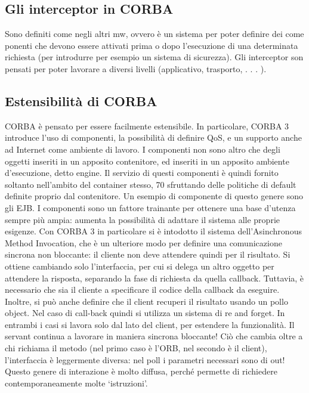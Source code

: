 \subsection{Gli interceptor in CORBA}
Sono definiti come negli altri mw, ovvero è un sistema per poter definire dei come
ponenti che devono essere attivati prima o dopo l'esecuzione di una determinata
richiesta (per introdurre per esempio un sistema di sicurezza). Gli interceptor
son pensati per poter lavorare a diversi livelli (applicativo, trasporto, . . . ).
\subsection{Estensibilità di CORBA}
CORBA è pensato per essere facilmente estensibile. In particolare, CORBA
3 introduce l'uso di componenti, la possibilità di definire QoS, e un supporto
anche ad Internet come ambiente di lavoro.
I componenti non sono altro che degli oggetti inseriti in un apposito contenitore, ed inseriti in un apposito ambiente
d'esecuzione, detto engine. Il servizio
di questi componenti è quindi fornito soltanto nell'ambito del container stesso,
70
sfruttando delle politiche di default definite proprio dal contenitore. Un esempio
di componente di questo genere sono gli EJB.
I componenti sono un fattore trainante per ottenere una base d'utenza sempre più ampia: aumenta la possibilità di
adattare il sistema alle proprie esigenze.
Con CORBA 3 in particolare si è intodotto il sistema dell'Asinchronous
Method Invocation, che è un ulteriore modo per definire una comunicazione
sincrona non bloccante: il cliente non deve attendere quindi per il risultato.
Si ottiene cambiando solo l'interfaccia, per cui si delega un altro oggetto per
attendere la risposta, separando la fase di richiesta da quella callback. Tuttavia,
è necessario che sia il cliente a specificare il codice della callback da eseguire.
Inoltre, si può anche definire che il client recuperi il risultato usando un pollo
object. Nel caso di call-back quindi si utilizza un sistema di re and forget. In
entrambi i casi si lavora solo dal lato del client, per estendere la funzionalità.
Il servant continua a lavorare in maniera sincrona bloccante! Ciò che cambia
oltre a chi richiama il metodo (nel primo caso è l'ORB, nel secondo è il client),
l'interfaccia è leggermente diversa: nel poll i parametri necessari sono di out!
Questo genere di interazione è molto diffusa, perché permette di richiedere
contemporaneamente molte {`}istruzioni'.
